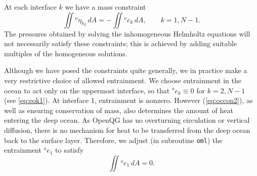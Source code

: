 \documentclass[11pt, a4paper,twoside]{article}
\newcommand{\etb}[2]{{{}^{#1}\eta_{#2}}}
\newcommand{\e}[2]{{{}^{#1}e_{#2}}}
\numberwithin{equation}{section}
\begin{document}
At each interface $k$ we have a mass constraint
\begin{equation}\label{eq:occon2}
\iint \etb{o}{k}_t \, dA =  - \iint \e{o}{k}\, dA, \quad\quad k = 1,N-1.
\end{equation}
The pressures obtained by solving the inhomogeneous Helmholtz equations will not necessarily satisfy these constraints; this is achieved by adding suitable multiples of the homogeneous solutions.

Although we have posed the constraints quite generally, we in practice make a very restrictive choice of allowed entrainment.
We choose entrainment in the ocean to act only on the uppermost interface, so that $\e{o}{k}\equiv0$ for $k=2,N-1$ (see \ref{eq:eok1}).
At interface 1, entrainment is nonzero.
However (\ref{eq:occon2}), as well as ensuring conservation of mass, also determines the amount of heat entering the deep ocean.
As OpenQG has no overturning circulation or vertical diffusion, there is no mechanism for heat to be transferred from the deep ocean back to the surface layer.
Therefore, we adjust (in subroutine \verb=oml=) the entrainment $\e{o}{1}$ to satisfy 
\begin{equation}\label{eq:occon2alt}
\iint \e{o}{1} \, dA =  0.
\end{equation}
\end{document}
